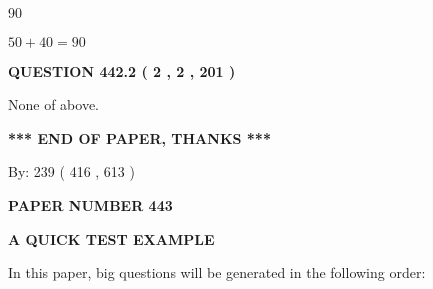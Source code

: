 \documentclass[12pt]{article}
\begin{document}
  
 
 
\noindent{}

90
 
 
 
 
\noindent{}

$ %
50 +  %
40=   %
90$
 
 
  
\vspace{0.2in}
  
{\textbf{\Large{QUESTION
442.2 
 ( 2 , 2 , 201 )
}}}
  
  
 
 
\noindent{}
 
 
 None of above.
 
 
 
 
   
   
 \vspace{0.2in}
 
   
   
   
   
\vspace{1.0in} 
{\textbf{\large{ *** END OF PAPER, THANKS *** }}} 
   
   
\hspace{1.0in} By: 
 239 ( 416 ,  613 )
   
   
   
   
\newpage 
\setcounter{page}{ 
   443001 } 
   
   
   
   
 {\textbf{ \Large{ PAPER NUMBER  443  }}}
   
   
\vspace{0.2in}
   
   
   
   
   
   
 \vspace{0.2in}
{\LARGE {\textbf{ A QUICK TEST EXAMPLE}}}
   
   
   
\vspace{0.2in}
   
In this paper, big questions will be generated in the following order: 
   
\end{document}
